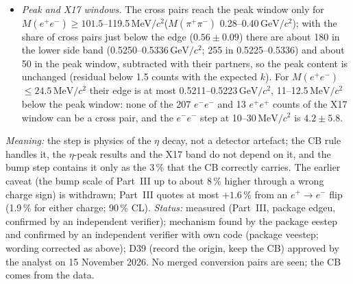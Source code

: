 \documentclass[11pt,a4paper]{article}
\newcommand{\Mee}{\ensuremath{M(e^{+}e^{-})}\xspace}
\newcommand{\Mpipi}{\ensuremath{M(\pi^{+}\pi^{-})}\xspace}
\newcommand{\GeVcc}{\ensuremath{\mathrm{GeV}/c^{2}}\xspace}
\newcommand{\MeVcc}{\ensuremath{\mathrm{MeV}/c^{2}}\xspace}
\begin{document}
\begin{itemize}
      with an acceptance that factorises per lepton the CB rule removes both kinds to within a few per cent (expected $k$ 0.96--1.02). At
      \Mee$\ge90$\,\MeVcc, where the bump is small, $N$ steps by $52.6\pm10.9$ counts, the CB by $35.8\pm8.6$, and $N-\mathrm{CB}=16.8\pm13.9$
      (Fig.~\ref{fig:res-eestep}b; verifier, with its own CB construction: $52.7\pm10.4$, $39.6\pm9.8$, $13.1\pm14.6$). Part~III compares this with
      the bump signal expected there, SMASH $\times f$ with the per-count C2 weights of D38 (16.9 counts: $z=-0.01$; a like-sign artefact
      without $e^+e^-$ partners would give $-19.0$, 2.6$\sigma$ away, statistical; about 2.3$\sigma$ with the error of the simulated prediction,
      $\pm6.7$); $k_{\mathrm{cross}}=1.00\pm0.39$ (independent check, still with the earlier constant C2 factors: $0.96\pm0.48$).
\item \emph{Peak and X17 windows.} The cross pairs reach the peak window only for \Mee$\ge101.5$--119.5\,\MeVcc (\Mpipi 0.28--0.40\,\GeVcc);
      with the share of cross pairs just below the edge ($0.56\pm0.09$) there are about 180 in the lower side band (0.5250--0.5336\,\GeVcc;
      255 in 0.5225--0.5336) and about 50 in the peak window, subtracted with their partners, so the peak content is unchanged (residual below
      1.5 counts with the expected $k$). For \Mee$\le24.5$\,\MeVcc their edge is at most 0.5211--0.5223\,\GeVcc, 11--12.5\,\MeVcc below the peak
      window: none of the 207 $e^-e^-$ and 13 $e^+e^+$ counts of the X17 window can be a cross pair, and the $e^-e^-$ step
      at 10--30\,\MeVcc is $4.2\pm5.8$.
\end{itemize}
\emph{Meaning:} the step is physics of the $\eta$ decay, not a detector artefact; the CB rule handles it, the $\eta$-peak results and the X17
band do not depend on it, and the bump step contains it only as the 3\,\% that the CB correctly carries. The earlier caveat (the bump scale of
Part~III up to about 8\,\% higher through a wrong charge sign) is withdrawn; Part~III quotes at most $+1.6$\,\% from an $e^+\to e^-$ flip
(1.9\,\% for either charge; 90\,\% CL).
\emph{Status:} measured (Part~III, package edgeu, confirmed by an independent verifier); mechanism found by the package eestep and confirmed by
an independent verifier with own code (package veestep; wording corrected as above); D39 (record the origin, keep the CB) approved by the analyst on
15 November 2026. No merged conversion pairs are seen; the CB comes from the data.
\end{document}
